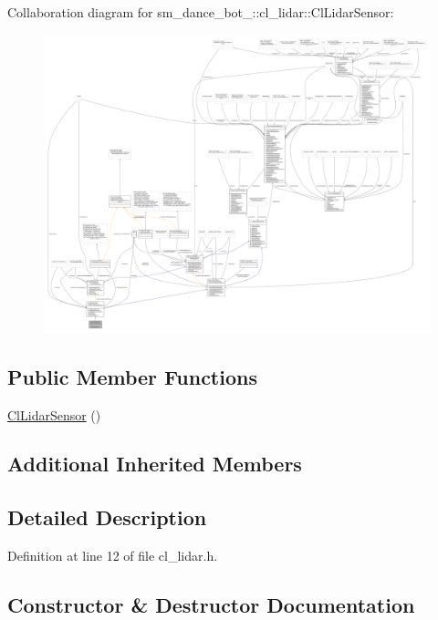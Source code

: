 Collaboration diagram for sm\+\_\+dance\+\_\+bot\+\_\+:\+:cl\+\_\+lidar\+:\+:Cl\+Lidar\+Sensor\+:
\nopagebreak
\begin{figure}[H]
\begin{center}
\leavevmode
\includegraphics[width=350pt]{classsm__dance__bot__2_1_1cl__lidar_1_1ClLidarSensor__coll__graph}
\end{center}
\end{figure}
\subsection*{Public Member Functions}
\begin{DoxyCompactItemize}
\item 
\hyperlink{classsm__dance__bot__2_1_1cl__lidar_1_1ClLidarSensor_a7b9afd5d50773cc882f5d0315db2100c}{Cl\+Lidar\+Sensor} ()
\end{DoxyCompactItemize}
\subsection*{Additional Inherited Members}


\subsection{Detailed Description}


Definition at line 12 of file cl\+\_\+lidar.\+h.



\subsection{Constructor \& Destructor Documentation}
\mbox{\label{classsm__dance__bot__2_1_1cl__lidar_1_1ClLidarSensor_a7b9afd5d50773cc882f5d0315db2100c}} 
